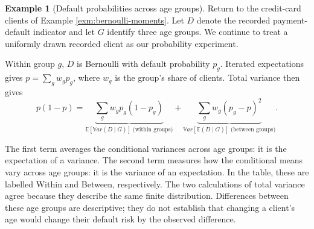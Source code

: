 \documentclass[
  11pt,
]{book}
\theoremstyle{definition}
\theoremstyle{definition}
\newtheorem{example}{Example}[chapter]
\theoremstyle{definition}
\theoremstyle{definition}
\theoremstyle{remark}
\begin{document}
\begin{example}[Default probabilities across age groups]
\protect\hypertarget{exm:credit-total-variance}{}\label{exm:credit-total-variance}Return to the credit-card clients of Example \ref{exm:bernoulli-moments}. Let \(D\) denote the recorded payment-default indicator and let \(G\) identify three age groups. We continue to treat a uniformly drawn recorded client as our probability experiment.

\begin{table}[H]
\centering\begingroup\fontsize{10}{12}\selectfont

\endgroup{}
\end{table}

Within group \(g\), \(D\) is Bernoulli with default probability \(p_g\). Iterated expectations gives \(p=\sum_g w_gp_g\), where \(w_g\) is the group's share of clients. Total variance then gives
\[
p(1-p)=\underbrace{\sum_g w_gp_g(1-p_g)}_{\mathbb{E}[\mathbb{V}ar(D\mid G)]\;\text{(within groups)}}
+\underbrace{\sum_g w_g(p_g-p)^2}_{\mathbb{V}ar[\mathbb{E}(D\mid G)]\;\text{(between groups)}}.
\]

\begin{table}[H]
\centering\begingroup\fontsize{10}{12}\selectfont

\endgroup{}
\end{table}

The first term averages the conditional variances across age groups: it is the expectation of a variance. The second term measures how the conditional means vary across age groups: it is the variance of an expectation. In the table, these are labelled Within and Between, respectively. The two calculations of total variance agree because they describe the same finite distribution. Differences between these age groups are descriptive; they do not establish that changing a client's age would change their default risk by the observed difference.
\end{example}
\end{document}
